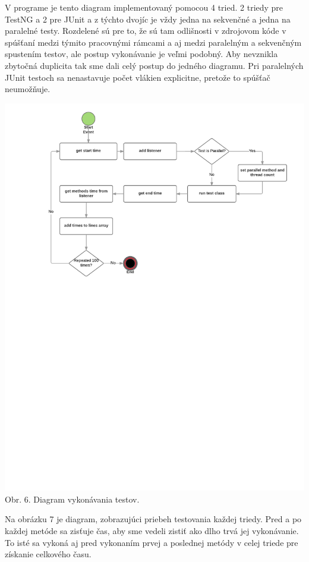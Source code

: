\documentclass[11pt,twoside,slovak,a4paper]{article}
\begin{document}
 	V programe je tento diagram implementovaný pomocou 4 tried. 2 triedy pre TestNG a 2 pre JUnit a z týchto dvojíc je vždy jedna na sekvenčné a jedna na paralelné testy. Rozdelené sú pre to, že sú tam odlišnosti v zdrojovom kóde v spúšťaní medzi týmito pracovnými rámcami a aj medzi paralelným a sekvenčným spustením testov, ale postup vykonávanie je veľmi podobný. Aby nevznikla zbytočná duplicita tak sme dali celý postup do jedného diagramu. Pri paralelných JUnit testoch sa nenastavuje počet vlákien explicitne, pretože to spúšťač neumožňuje.
 	
 	\begin{center}
 		\hspace*{-2.5cm} 
 		\includegraphics[width = 500pt, trim = 0pt 440pt 0pt 70pt]{test}
 		\newline
 		\tiny Obr. 6. Diagram vykonávania testov.
 	\end{center}
 	
 	Na obrázku 7 je diagram, zobrazujúci priebeh testovania každej triedy. Pred a po každej metóde sa zisťuje čas, aby sme vedeli zistiť ako dlho trvá jej vykonávanie. To isté sa vykoná aj pred vykonaním prvej a poslednej metódy v celej triede pre získanie celkového času.
 	
\end{document}
